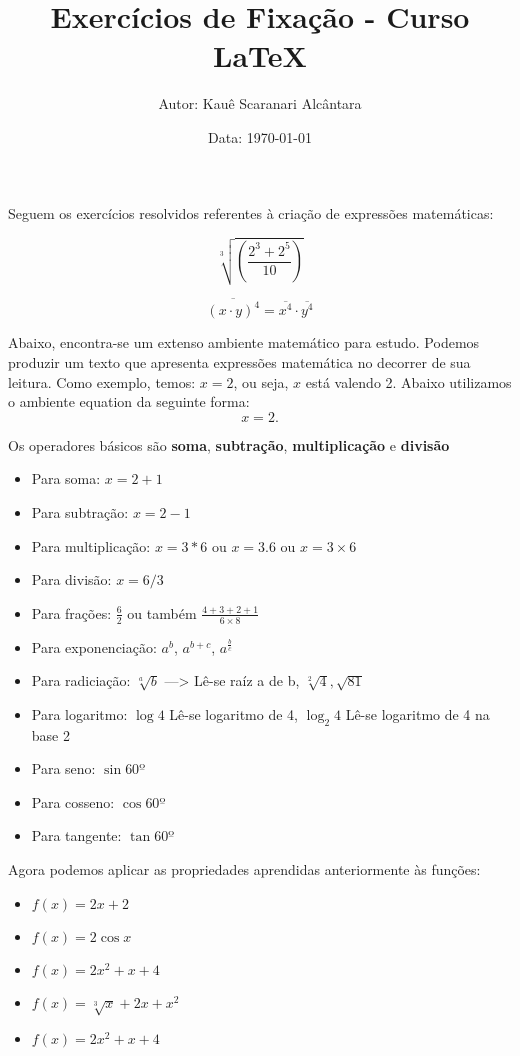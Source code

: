\documentclass[a4paper, 12pt]{article}
\title{{\LARGE \textbf{Exercícios de Fixação - Curso LaTeX}}}
\author{Autor: Kauê Scaranari Alcântara}
\date{Data: \today}
\begin{document}
\maketitle
Seguem os exercícios resolvidos referentes à criação de expressões matemáticas:

\begin{equation}
\sqrt[3]{\left(\frac{2^{3} + 2^{5}}{10}\right)}
\end{equation}

\begin{equation}
\overline{(x \cdot y)^{4}} = \overline{x^{4}} \cdot \overline{y^{4}}
\end{equation}

Abaixo, encontra-se um extenso ambiente matemático para estudo.
Podemos produzir um texto que apresenta expressões matemática no decorrer de sua leitura. Como exemplo, temos: $x = 2$, ou seja, $x$ está valendo 2.
Abaixo utilizamos o ambiente equation da seguinte forma:
\begin{equation}
x = 2.
\end{equation}

Os operadores básicos são \textbf{soma}, \textbf{subtração}, \textbf{multiplicação} e \textbf{divisão}
\begin{itemize}
\item Para soma: $x = 2 + 1$
\item Para subtração: $x = 2 - 1$
\item Para multiplicação: $x = 3*6$ ou $x = 3.6$ ou $x = 3 \times 6$
\item Para divisão: $x = 6/3$
\item Para frações: $\frac{6}{2}$ ou também $\frac{4+3+2+1}{6\times8}$
\item Para exponenciação: $a^b$, $a^{b+c}$, $a^{\frac{b}{c}}$
\item Para radiciação: $\sqrt[a]{b}$ ---> Lê-se raíz a de b, $\sqrt[2]{4}, \sqrt{81}$
\item Para logaritmo: $\log 4$ Lê-se logaritmo de 4, $\log_{2}4$ Lê-se logaritmo de 4 na base 2
\item Para seno: $\sin 60º$
\item Para cosseno: $\cos 60º$
\item Para tangente: $\tan 60º$
\end{itemize}

Agora podemos aplicar as propriedades aprendidas anteriormente às funções:
\begin{itemize}
\item $f(x) = 2x + 2$
\item $f(x) = 2\cos x$
\item $f(x) = 2x^{2} + x + 4$
\item $f(x) = \sqrt[3]{x} + 2x + x^{2}$
\item $f(x) = 2x^{2} + x + 4$
\end{itemize}
\end{document}

